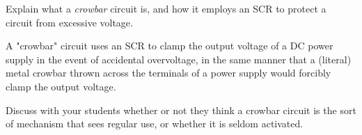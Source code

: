 

Explain what a {\it crowbar} circuit is, and how it employs an SCR to protect a circuit from excessive voltage.







A "crowbar" circuit uses an SCR to clamp the output voltage of a DC power supply in the event of accidental overvoltage, in the same manner that a (literal) metal crowbar thrown across the terminals of a power supply would forcibly clamp the output voltage.







Discuss with your students whether or not they think a crowbar circuit is the sort of mechanism that sees regular use, or whether it is seldom activated.





